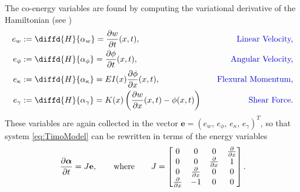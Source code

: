 \documentclass[preprint,12pt]{elsarticle}
\newcommand{\RevOne}[1]{\textcolor{blue!80!black}{#1}}
\begin{document}
The co-energy variables are found by computing the variational derivative of the Hamiltonian (see  \cite{MacchelliTimo})
\begin{equation}
\begin{aligned}
e_{w} &:= \diffd{H}{\alpha_w} = \diffp{w}{t}(x,t), \quad &\text{\RevOne{Linear Velocity,}} \\
e_{\phi} &:= \diffd{H}{\alpha_{\phi}} = \diffp{\phi}{t}(x,t), \quad &\text{\RevOne{Angular Velocity,}} \\
e_{\kappa} &:= \diffd{H}{\alpha_{\kappa}} =EI(x) \diffp{\phi}{x}(x,t), \quad &\text{\RevOne{Flexural Momentum,}}\\
e_{\gamma} &:= \diffd{H}{\alpha_{\gamma}} = K(x) \left(\diffp{w}{x}(x,t) - \phi(x,t) \right) \quad &\text{\RevOne{Shear Force}}. \\
\end{aligned}
\end{equation}
These variables are again collected in the vector $\bm{e} = (e_{w}, \, e_{\phi}, \, e_{\kappa}, \, e_{\gamma} )^T $, so that \RevOne{system \eqref{eq:TimoModel} can be rewritten in terms of the energy variables}
\begin{equation}
\label{eq:PH_Timo}
\diffp{\bm{\alpha}}{t} = J \mathbf{e},  	\qquad \text{where} \qquad
J = 
\begin{bmatrix}
0 & 0 & 0 & \diffp{}{x} \\
0 & 0 & \diffp{}{x} & 1  \\
0 & \diffp{}{x} & 0 & 0 \\
\diffp{}{x} & -1 & 0 & 0 \\
\end{bmatrix} .
\end{equation}
\end{document}
